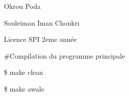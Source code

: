 
\begin{DoxyItemize}
\item Okrou Poda
\item Souleiman Iman Choukri
\item Licence S\-P\-I 2eme année
\end{DoxyItemize}

\#\-Compilation du programme principale


\begin{DoxyItemize}
\item \$ make clean
\item \$ make awale 
\end{DoxyItemize}
